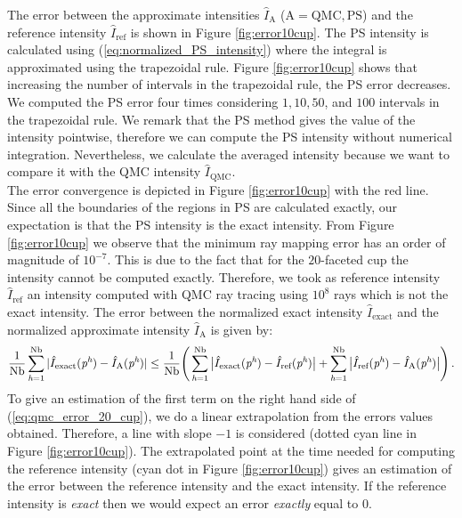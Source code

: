 The error between the approximate intensities $\hat{I}_{\textrm{A}}$ ($\textrm{A} = \textrm{QMC}, \textrm{PS}$) and the reference intensity $\hat{I}_{\textrm{ref}}$ is shown in Figure \ref{fig:error10cup}. 
The PS intensity is calculated using (\ref{eq:normalized_PS_intensity}) where the integral is approximated using the trapezoidal rule. Figure \ref{fig:error10cup} shows that increasing the number of intervals in the trapezoidal rule, the PS error decreases. We computed the PS error four times considering $1, 10, 50$, and $100$ intervals in the trapezoidal rule. 
We remark that the PS method gives the value of the intensity pointwise, therefore we can compute the PS intensity without numerical integration. Nevertheless, we calculate the averaged intensity because we want to compare it with the QMC intensity $\hat{I}_{\textrm{QMC}}$.
\\ \indent The error convergence is depicted in Figure \ref{fig:error10cup} with the red line.
Since all the boundaries of the regions in PS are calculated exactly, our expectation is that the PS intensity is the exact intensity.
From Figure \ref{fig:error10cup} we observe that the minimum ray mapping error has an order of magnitude of $10^{-7}$.
This is due to the fact that for the $20$-faceted cup the intensity cannot be computed exactly. 
Therefore, we took as reference intensity $\hat{I}_{\textrm{ref}}$ an intensity computed with QMC ray tracing using $10^8$ rays which is not the exact intensity.
The error between the normalized exact intensity $\hat{I}_{\textrm{exact}}$ and the normalized approximate intensity $\hat{I}_{\textrm{A}}$ is given by:
\begin{equation}\label{eq:qmc_error_20_cup}
\frac{1}{\textrm{Nb}}\sum_{\textit{h} = 1}^{\textrm{Nb}}| \hat{I}_{\textrm{exact}}(\textit{p}^{\textit{h}}) - \hat{I}_{\textrm{A}}(\textit{p}^{\textit{h}})| \leq
\frac{1}{\textrm{Nb}}\Bigg(\sum_{\textit{h} = 1}^{\textrm{Nb}}\big| \hat{I}_{\textrm{exact}}(\textit{p}^{\textit{h}}) - \hat{I}_{\textrm{ref}}(\textit{p}^{\textit{h}})\big| +
\sum_{\textit{h} = 1}^{\textrm{Nb}}\big| \hat{I}_{\textrm{ref}}(\textit{p}^{\textit{h}}) - \hat{I}_{\textrm{A}}(\textit{p}^{\textit{h}})\big|\Bigg)\,.
\end{equation}
To give an estimation of the first term on the right hand side of (\ref{eq:qmc_error_20_cup}), we do a linear extrapolation from the errors values obtained. Therefore, a line with slope $-1$ is considered (dotted cyan line in Figure \ref{fig:error10cup}). The extrapolated point at the time needed for computing the reference intensity (cyan dot in Figure \ref{fig:error10cup}) gives an estimation of the error between the reference intensity and the exact intensity. If the reference intensity is \textit{exact} then we would expect an error \textit{exactly} equal to $0$.
